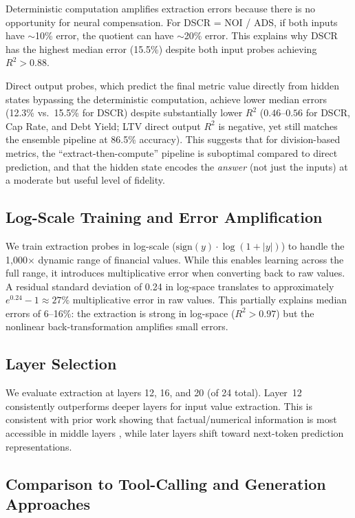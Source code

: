 Deterministic computation amplifies extraction errors because there is
no opportunity for neural compensation. For DSCR = NOI / ADS, if both
inputs have ${\sim}$10\% error, the quotient can have ${\sim}$20\%
error. This explains why DSCR has the highest median error (15.5\%)
despite both input probes achieving $R^2 > 0.88$.

Direct output probes, which predict the final metric value directly
from hidden states bypassing the deterministic computation, achieve
lower median errors (12.3\% vs.\ 15.5\% for DSCR) despite
substantially lower $R^2$ ($0.46$--$0.56$ for DSCR, Cap Rate, and
Debt Yield; LTV direct output $R^2$ is negative, yet still matches
the ensemble pipeline at 86.5\% accuracy). This suggests that
for division-based metrics, the ``extract-then-compute'' pipeline
is suboptimal compared to direct prediction, and that the hidden
state encodes the \emph{answer} (not just the inputs) at a moderate
but useful level of fidelity.

\subsection{Log-Scale Training and Error Amplification}
\label{sec:analysis:logscale}

We train extraction probes in log-scale ($\text{sign}(y) \cdot
\log(1 + |y|)$) to handle the 1{,}000$\times$ dynamic range of
financial values. While this enables learning across the full range,
it introduces multiplicative error when converting back to raw values.
A residual standard deviation of 0.24 in log-space translates to
approximately $e^{0.24} - 1 \approx 27\%$ multiplicative error in
raw values. This partially explains median errors of 6--16\%: the
extraction is strong in log-space ($R^2 > 0.97$) but the
nonlinear back-transformation amplifies small errors.

\subsection{Layer Selection}
\label{sec:analysis:layer}

We evaluate extraction at layers 12, 16, and 20 (of 24 total). Layer~12
consistently outperforms deeper layers for input value extraction. This
is consistent with prior work showing that factual/numerical information
is most accessible in middle layers
\citep{geva2023dissecting,meng2022locating}, while later layers shift
toward next-token prediction representations.

\subsection{Comparison to Tool-Calling and Generation Approaches}
\label{sec:analysis:toolcalling}

